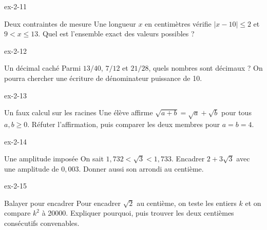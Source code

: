 \clearpage{}
\begin{blocLivre}{ex-2-11}
\begin{exercice}[3]{Deux contraintes de mesure}
Une longueur $x$ en centimètres vérifie $|x-10|\le2$ et $9<x\le13$. Quel est l’ensemble exact des valeurs possibles ?
\end{exercice}
\end{blocLivre}
\begin{blocLivre}{ex-2-12}
\begin{exercice}[3]{Un décimal caché}
Parmi $13/40$, $7/12$ et $21/28$, quels nombres sont décimaux ? On pourra chercher une écriture de dénominateur puissance de 10.
\end{exercice}
\end{blocLivre}
\begin{blocLivre}{ex-2-13}
\begin{exercice}[3]{Un faux calcul sur les racines}
Une élève affirme $\sqrt{a+b}=\sqrt a+\sqrt b$ pour tous $a,b\ge0$. Réfuter l’affirmation, puis comparer les deux membres pour $a=b=4$.
\end{exercice}
\end{blocLivre}
\begin{blocLivre}{ex-2-14}
\begin{exercice}[3]{Une amplitude imposée}
On sait $1{,}732<\sqrt3<1{,}733$. Encadrer $2+3\sqrt3$ avec une amplitude de $0{,}003$. Donner aussi son arrondi au centième.
\end{exercice}
\end{blocLivre}
\begin{blocLivre}{ex-2-15}
\begin{exercice}[3]{Balayer pour encadrer}
Pour encadrer $\sqrt2$ au centième, on teste les entiers $k$ et on compare $k^2$ à 20000. Expliquer pourquoi, puis trouver les deux centièmes consécutifs convenables.
\end{exercice}
\end{blocLivre}

\clearpage
